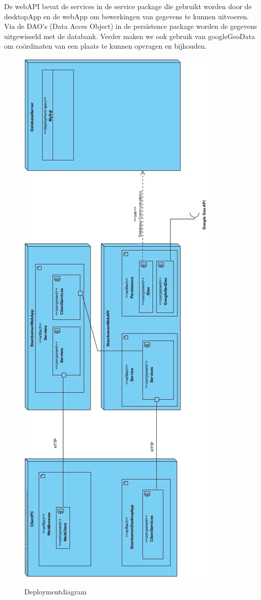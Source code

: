 \documentclass[pdftex,a4paper,12pt,twoside]{report}
\begin{document}
De webAPI bevat de services in de service package die gebruikt worden door de desktopApp en de webApp om bewerkingen van gegevens te kunnen uitvoeren. Via de DAO’s (Data Acces Object) in de persistence package worden de gegevens uitgewisseld met de databank.
Verder maken we ook gebruik van googleGeoData om coördinaten van een plaats te kunnen opvragen en bijhouden.
\begin{center}
\begin{figure}[!htb]
\includegraphics[height=\textheight]{images/deploymentdiagram.png}\\
\caption{Deploymentdiagram}
\end{figure}
\end{center}
\end{document}
